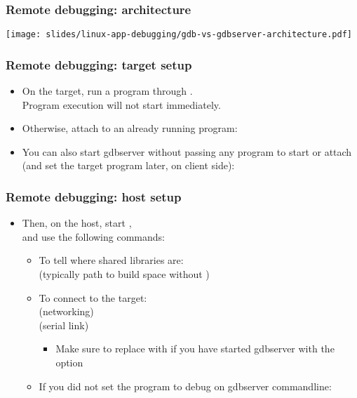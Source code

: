 \begin{frame}
  \frametitle{Remote debugging: architecture}
  \begin{center}
    \texttt{[image: slides/linux-app-debugging/gdb-vs-gdbserver-architecture.pdf]}
  \end{center}
\end{frame}

\begin{frame}
  \frametitle{Remote debugging: target setup}
  \begin{itemize}
  \item On the target, run a program through .\\
    Program execution will not start immediately.\\
  \item Otherwise, attach  to an already running program:\\
  \item You can also start gdbserver without passing any program to start or
  attach (and set the target program later, on client side):\\
  \end{itemize}
\end{frame}

\begin{frame}
  \frametitle{Remote debugging: host setup}
  \begin{itemize}
  \item Then, on the host, start ,\\
    and use the following  commands:
    \begin{itemize}
    \item To tell  where shared libraries are:\\
       (typically path to build space without )
    \item To connect to the target:\\
       (networking)\\
       (serial link)\\
      \begin{itemize}
        \item Make sure to replace  with  if you have started gdbserver with the 
      option
      \end{itemize}
    \item If you did not set the program to debug on gdbserver commandline:\\
    \end{itemize}
  \end{itemize}
\end{frame}

